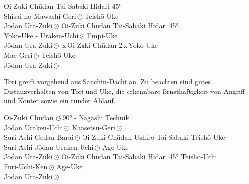 	\setcounter{num}{0}
\setcounter{numz}{0}
\begin{tcbitemize}[right=4pt,left=4pt,raster columns=3,raster equal height,colframe=GKD,colback=white,fonttitle=\bfseries]
	\tcbitem[squeezed title*={Kumite Ura 1}]
	Oi-Zuki Ch\={u}dan
	Tai-Sabaki Hidari 45°\\
	Shisai no Mawashi Geri\,\(\odot\)
	Teish\={o}-Uke\\
	J\={o}dan Ura-Zuki\,\(\odot\)
	\tcbitem[squeezed title*={Kumite Ura 2}]
	Oi-Zuki Ch\={u}dan
	Tai-Sabaki Hidari 45°\\
	Yoko-Uke - Uraken-Uchi\,\(\odot\)
	Empi-Uke\\
	J\={o}dan Ura-Zuki\,\(\odot\)
	\,x\,Oi-Zuki Ch\={u}dan
	2\,x\,Yoko-Uke\\
	Mae-Geri\,\(\odot\)
	Teish\={o}-Uke\\
	J\={o}dan Ura-Zuki\,\(\odot\)
\end{tcbitemize}
\null\vfill\null
\begin{pfbox}
	Tori greift vorgehend aus Sanchin-Dachi an. Zu beachten sind gutes Distanzverhalten von Tori und Uke, die erkennbare Ernsthaftigkeit von Angriff und Konter sowie ein runder Ablauf.
\end{pfbox}
\null\vfill\null
\begin{tcbitemize}[right=4pt,left=4pt,raster columns=3,raster equal height,colframe=GKD,colback=white,fonttitle=\bfseries]
	\tcbitem[squeezed title*={Kumite Ura 4}]
	Oi-Zuki Ch\={u}dan
	\(\circlearrowleft\)\,90° - Nagashi Technik\\
	J\={o}dan Uraken-Uchi\,\(\odot\)
	Kansetsu-Geri\,\(\odot\)\\
	Suri-Ashi Gedan-Barai\,\(\odot\)
	\tcbitem[squeezed title*={Kumite Ura 5}]
	Oi-Zuki Ch\={u}dan
	Ushiro Tai-Sabaki Teish\={o}-Uke\\
	Suri-Ashi J\={o}dan Uraken-Uchi\,\(\odot\)
	Age-Uke\\
	J\={o}dan Ura-Zuki\,\(\odot\)
	\tcbitem[squeezed title*={Kumite Ura 6}]
	Oi-Zuki Ch\={u}dan
	Tai-Sabaki Hidari 45° Teish\={o}-Uchi\\
	Furi-Uchi-Ken\,\(\odot\)
	Age-Uke\\
	J\={o}dan Ura-Zuki\,\(\odot\)
\end{tcbitemize}
